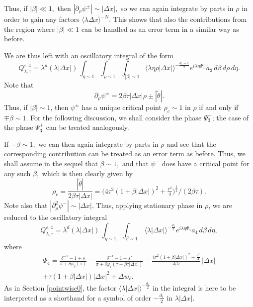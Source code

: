 \documentclass[leqno]{amsart}
\theoremstyle{definition}
\theoremstyle{remark}
\numberwithin{equation}{section}
\newcommand{\jp}[1]{\langle{#1}\rangle}
\newcommand\la{{\lambda}}
\begin{document}
Thus, if $|\beta|\ll 1,$ then $|\partial_\rho\psi^{\pm}| \sim |\Delta x|,$  so we can again integrate by parts in $\rho$ in order  to gain  any factors $ \jp{\lambda\Delta x}^{-N}.$ This shows that  also the contributions from the region where  $|\beta|\ll 1$ can be handled as an error term in a similar way as before.

We are thus left with an oscillatory integral of the form
\begin{equation}
Q^{\varepsilon,4}_{\lambda,\tau}=
\lambda^{d} (\la|\Delta x|)\,   \int_{\eta\sim 1}  \int_{\rho\sim 1}  \int_{|\beta| \sim 1} 
\langle \lambda\eta \rho |\Delta x|\rangle^{-\frac{d_1-1}{2}} e^{i\lambda\eta \Psi^\pm_3}   \tilde a_3\, d\beta\,  d\rho\,d\eta.   \label{eq:stat-rho-ii}
\end{equation}
Note that
\[
\partial_\rho \psi^\pm
=2\beta \tau \left|\Delta x\right| \rho \pm |\tilde\theta|.
\]
Thus, if $|\beta|\sim 1$, then $\psi^\pm$ has a unique critical point
$\rho_c\sim 1$ in $\rho$ if and only if $\mp\beta\sim 1$. For the following discussion, we shall consider the phase $\Psi_3^-$; the case of the phase $\Psi_3^+$ can be treated analogously.

If  $-\beta\sim 1,$ we can then again integrate by parts in $\rho$ and see that the corresponding contribution can be treated as an error term as before. Thus, we shall assume in the sequel that $\beta\sim 1,$ and that $\psi^-$ does have a critical point for any such $\beta,$ which is then clearly given by
\[
\rho_c = \frac{|\tilde\theta|}{2\beta \tau|\Delta x|}=\Big(4\tau^2(1+\beta|\Delta x|)^2+\tfrac {r^2}4\Big)^{\frac{1}{2}}/(2\beta\tau).
\]
Note also that $|\partial_\rho^2 \psi^-|\sim |\Delta x|.$ Thus, applying stationary phase in $\rho$, we are reduced to the oscillatory integral 
\begin{equation}
Q^{\varepsilon,4}_{\lambda,\tau}=
\lambda^{d} (\la|\Delta x|)\,   \int_{\eta\sim 1}  \int_{\beta \sim 1} \,
\langle \lambda|\Delta x|\rangle^{-\frac{d_1}{2}} e^{i\lambda\eta \Psi_4} a_4 \,   d\beta\,d\eta,   \label{eq:stat-rhoc}
\end{equation}
where
\begin{multline*}
\Psi_4 = 
 \frac{\delta^{-1}-1 + s}{\pi + \delta \varphi_\ell(\tau)}
- \frac{ \delta^{-1}-1 + s'}{\pi + \delta \varphi_\ell\left(\tau + \beta\tau |\Delta x|\right)}
- \frac{4\tau^2(1+\beta|\Delta x|)^2+\tfrac {r^2}4}{4\beta\tau} \,|\Delta x|\\
+\tau\left(1+ \beta|\Delta x|\right)|\Delta x|^2 + \Delta w_\ell.
\end{multline*}
As in Section \ref{pointwise0}, the factor $\langle \lambda|\Delta x|\rangle^{-\frac{d_1}{2}}$ in the integral is here to be interpreted as a shorthand for a symbol of order $-\frac{d_1}{2}$ in $\la|\Delta x|$.
\end{document}
